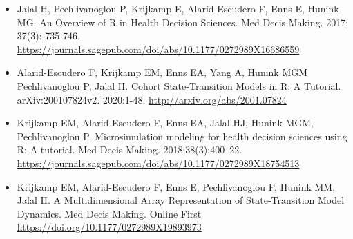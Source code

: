 \documentclass[
]{article}
\begin{document}
\begin{itemize}
\item
  Jalal H, Pechlivanoglou P, Krijkamp E, Alarid-Escudero F, Enns E,
  Hunink MG. An Overview of R in Health Decision Sciences. Med Decis
  Making. 2017; 37(3): 735-746.
  \url{https://journals.sagepub.com/doi/abs/10.1177/0272989X16686559}
\item
  Alarid-Escudero F, Krijkamp EM, Enns EA, Yang A, Hunink MGM
  Pechlivanoglou P, Jalal H. Cohort State-Transition Models in R: A
  Tutorial. arXiv:200107824v2. 2020:1-48.
  \url{http://arxiv.org/abs/2001.07824}
\item
  Krijkamp EM, Alarid-Escudero F, Enns EA, Jalal HJ, Hunink MGM,
  Pechlivanoglou P. Microsimulation modeling for health decision
  sciences using R: A tutorial. Med Decis Making. 2018;38(3):400--22.
  \url{https://journals.sagepub.com/doi/abs/10.1177/0272989X18754513}
\item
  Krijkamp EM, Alarid-Escudero F, Enns E, Pechlivanoglou P, Hunink MM,
  Jalal H. A Multidimensional Array Representation of State-Transition
  Model Dynamics. Med Decis Making. Online First
  \url{https://doi.org/10.1177/0272989X19893973}
\end{itemize}
\end{document}
